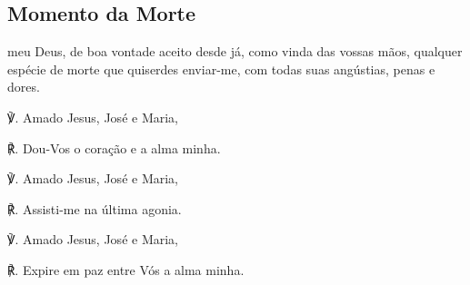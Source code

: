 \subsection{Momento da Morte}
 meu Deus, de boa vontade aceito desde já, como vinda das vossas mãos, qualquer espécie de morte que quiserdes enviar-me, com todas suas angústias, penas e dores.\par
℣. Amado Jesus, José e Maria,\par
℟. Dou-Vos o coração e a alma minha.\par
℣. Amado Jesus, José e Maria,\par
℟. Assisti-me na última agonia.\par
℣. Amado Jesus, José e Maria,\par
℟. Expire em paz entre Vós a alma minha.\par

